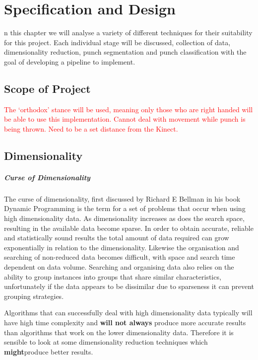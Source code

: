 %
%
\let\textcircled=\pgftextcircled
\chapter{Specification and Design}

n this chapter we will analyse a variety of different techniques for their suitability for this project. Each individual stage will be discussed, collection of data, dimensionality reduction, punch segmentation and punch classification with the goal of developing a pipeline to implement.


\section{Scope of Project}
\label{sec:sec01}
\textcolor{red}{
The `orthodox' stance will be used, meaning only those who are right handed will be able to use this implementation.
Cannot deal with movement while punch is being thrown.
Need to be a set distance from the Kinect.}

\section{Dimensionality}
\paragraph{Curse of Dimensionality}
The curse of dimensionality, first discussed by Richard E Bellman in his book Dynamic Programming\cite{dynprog} is the term for a set of problems that occur when using high dimensionality data. As dimensionality increases as does the search space, resulting in the available data become sparse. In order to obtain accurate, reliable and statistically sound results the total amount of data required can grow exponentially in relation to the dimensionality. Likewise the organisation and searching of non-reduced data becomes difficult, with space and search time dependent on data volume. Searching and organising data also relies on the ability to group instances into groups that share similar characteristics, unfortunately if the data appears to be dissimilar due to sparseness it can prevent grouping strategies.

Algorithms that can successfully deal with high dimensionality data typically will have high time complexity and {\bf will not always} produce more accurate results than algorithms that work on the lower dimensionality data. Therefore it is sensible to look at some dimensionality reduction techniques which {\bf might}produce better results.

